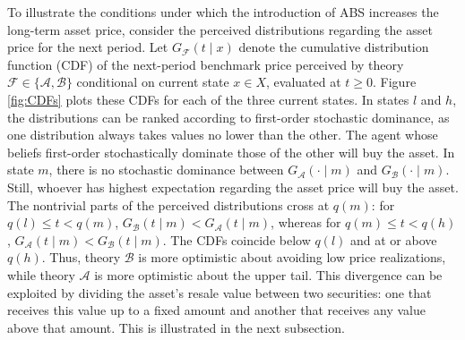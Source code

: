 \documentclass[11pt]{article}
\theoremstyle{plain}
\begin{document}
To illustrate the conditions under which the introduction of ABS increases the long-term asset price, consider the perceived distributions regarding the asset price for the next period. Let $G_\mathcal{F}(t\mid x)$ denote the cumulative distribution function (CDF) of the next-period benchmark price perceived by theory $\mathcal{F} \in \{\mathcal{A},\mathcal{B}\}$ conditional on current state $x\in X$, evaluated at $t\geq0$. Figure \ref{fig:CDFs} plots these CDFs for each of the three current states. In states $l$ and $h$, the distributions can be ranked according to first-order stochastic dominance, as one distribution always takes values no lower than the other. The agent whose beliefs first-order stochastically dominate those of the other will buy the asset. In state $m$, there is no stochastic dominance between $G_\mathcal{A}(\cdot\mid m)$ and $G_\mathcal{B}(\cdot\mid m)$. Still, whoever has highest expectation regarding the asset price will buy the asset. The nontrivial parts of the perceived distributions cross at $q(m)$: for $q(l)\leq t<q(m)$, $G_\mathcal{B}(t\mid m)<G_\mathcal{A}(t\mid m)$, whereas for $q(m)\leq t<q(h)$, $G_\mathcal{A}(t\mid m)<G_\mathcal{B}(t\mid m)$. The CDFs coincide below $q(l)$ and at or above $q(h)$. Thus, theory $\mathcal{B}$ is more optimistic about avoiding low price realizations, while theory $\mathcal{A}$ is more optimistic about the upper tail. This divergence can be exploited by dividing the asset's resale value between two securities: one that receives this value up to a fixed amount and another that receives any value above that amount. This is illustrated in the next subsection.
\end{document}
